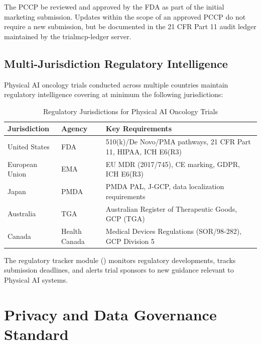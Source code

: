 \documentclass[11pt,letterpaper]{article}
\begin{document}
The PCCP \SHALL{} be reviewed and approved by the FDA as part of the initial marketing submission. Updates within the scope of an approved PCCP do not require a new submission, but \SHALL{} be documented in the 21 CFR Part 11 audit ledger maintained by the trialmcp-ledger server.

\subsection{Multi-Jurisdiction Regulatory Intelligence}

Physical AI oncology trials conducted across multiple countries \SHALL{} maintain regulatory intelligence covering at minimum the following jurisdictions:

\begin{table}[H]
\centering
\caption{Regulatory Jurisdictions for Physical AI Oncology Trials}
\small
\begin{tabularx}{\textwidth}{l l X}
\toprule
\textbf{Jurisdiction} & \textbf{Agency} & \textbf{Key Requirements} \\
\midrule
United States & FDA & 510(k)/De Novo/PMA pathways, 21 CFR Part 11, HIPAA, ICH E6(R3) \\
European Union & EMA & EU MDR (2017/745), CE marking, GDPR, ICH E6(R3) \\
Japan & PMDA & PMDA PAL, J-GCP, data localization requirements \\
Australia & TGA & Australian Register of Therapeutic Goods, GCP (TGA) \\
Canada & Health Canada & Medical Devices Regulations (SOR/98-282), GCP Division 5 \\
\bottomrule
\end{tabularx}
\end{table}

The regulatory tracker module () monitors regulatory developments, tracks submission deadlines, and alerts trial sponsors to new guidance relevant to Physical AI systems.

\section{Privacy and Data Governance Standard}
\label{sec:part4}
\end{document}

